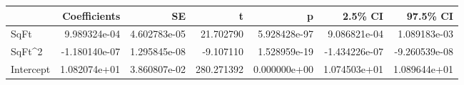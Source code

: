 \begin{tabular}{lrrrrrr}
\toprule
{} &  Coefficients &            SE &           t &             p &       2.5\% CI &      97.5\% CI \\
\midrule
SqFt      &  9.989324e-04 &  4.602783e-05 &   21.702790 &  5.928428e-97 &  9.086821e-04 &  1.089183e-03 \\
SqFt\textasciicircum 2    & -1.180140e-07 &  1.295845e-08 &   -9.107110 &  1.528959e-19 & -1.434226e-07 & -9.260539e-08 \\
Intercept &  1.082074e+01 &  3.860807e-02 &  280.271392 &  0.000000e+00 &  1.074503e+01 &  1.089644e+01 \\
\bottomrule
\end{tabular}
